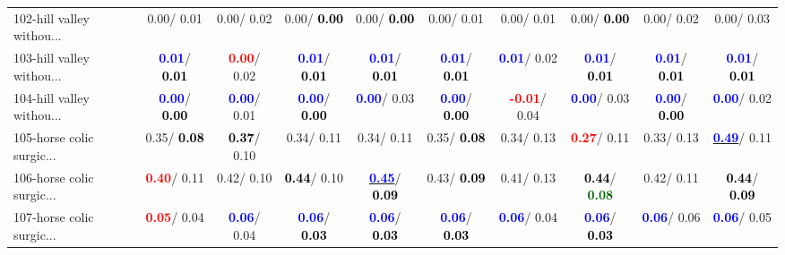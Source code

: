 \begin{table}[h]
\begin{center}
{\begin{tabular}{lc|c|c|c|c|c|c|c|c}
102-hill valley withou... &   0.00/  0.01 &   0.00/  0.02 &   0.00/\textcolor{black}{\textbf{  0.00}} &   0.00/\textcolor{black}{\textbf{  0.00}} &   0.00/  0.01 &   0.00/  0.01 &   0.00/\textcolor{black}{\textbf{  0.00}} &   0.00/  0.02 &   0.00/  0.03 \\
103-hill valley withou... & \textcolor{blue}{\textbf{  0.01}}/\textcolor{black}{\textbf{  0.01}} & \textcolor{red}{\textbf{  0.00}}/  0.02 & \textcolor{blue}{\textbf{  0.01}}/\textcolor{black}{\textbf{  0.01}} & \textcolor{blue}{\textbf{  0.01}}/\textcolor{black}{\textbf{  0.01}} & \textcolor{blue}{\textbf{  0.01}}/\textcolor{black}{\textbf{  0.01}} & \textcolor{blue}{\textbf{  0.01}}/  0.02 & \textcolor{blue}{\textbf{  0.01}}/\textcolor{black}{\textbf{  0.01}} & \textcolor{blue}{\textbf{  0.01}}/\textcolor{black}{\textbf{  0.01}} & \textcolor{blue}{\textbf{  0.01}}/\textcolor{black}{\textbf{  0.01}} \\ \hline
104-hill valley withou... & \textcolor{blue}{\textbf{  0.00}}/\textcolor{black}{\textbf{  0.00}} & \textcolor{blue}{\textbf{  0.00}}/  0.01 & \textcolor{blue}{\textbf{  0.00}}/\textcolor{black}{\textbf{  0.00}} & \textcolor{blue}{\textbf{  0.00}}/  0.03 & \textcolor{blue}{\textbf{  0.00}}/\textcolor{black}{\textbf{  0.00}} & \textcolor{red}{\textbf{ -0.01}}/  0.04 & \textcolor{blue}{\textbf{  0.00}}/  0.03 & \textcolor{blue}{\textbf{  0.00}}/\textcolor{black}{\textbf{  0.00}} & \textcolor{blue}{\textbf{  0.00}}/  0.02 \\
105-horse colic surgic... &   0.35/\textcolor{black}{\textbf{  0.08}} & \textcolor{black}{\textbf{  0.37}}/  0.10 &   0.34/  0.11 &   0.34/  0.11 &   0.35/\textcolor{black}{\textbf{  0.08}} &   0.34/  0.13 & \textcolor{red}{\textbf{  0.27}}/  0.11 &   0.33/  0.13 & \underline{\textcolor{blue}{\textbf{  0.49}}}/  0.11 \\
106-horse colic surgic... & \textcolor{red}{\textbf{  0.40}}/  0.11 &   0.42/  0.10 & \textcolor{black}{\textbf{  0.44}}/  0.10 & \underline{\textcolor{blue}{\textbf{  0.45}}}/\textcolor{black}{\textbf{  0.09}} &   0.43/\textcolor{black}{\textbf{  0.09}} &   0.41/  0.13 & \textcolor{black}{\textbf{  0.44}}/\textcolor{darkgreen}{\textbf{  0.08}} &   0.42/  0.11 & \textcolor{black}{\textbf{  0.44}}/\textcolor{black}{\textbf{  0.09}} \\
107-horse colic surgic... & \textcolor{red}{\textbf{  0.05}}/  0.04 & \textcolor{blue}{\textbf{  0.06}}/  0.04 & \textcolor{blue}{\textbf{  0.06}}/\textcolor{black}{\textbf{  0.03}} & \textcolor{blue}{\textbf{  0.06}}/\textcolor{black}{\textbf{  0.03}} & \textcolor{blue}{\textbf{  0.06}}/\textcolor{black}{\textbf{  0.03}} & \textcolor{blue}{\textbf{  0.06}}/  0.04 & \textcolor{blue}{\textbf{  0.06}}/\textcolor{black}{\textbf{  0.03}} & \textcolor{blue}{\textbf{  0.06}}/  0.06 & \textcolor{blue}{\textbf{  0.06}}/  0.05 \\

\end{tabular}}
\end{center}
\end{table}
